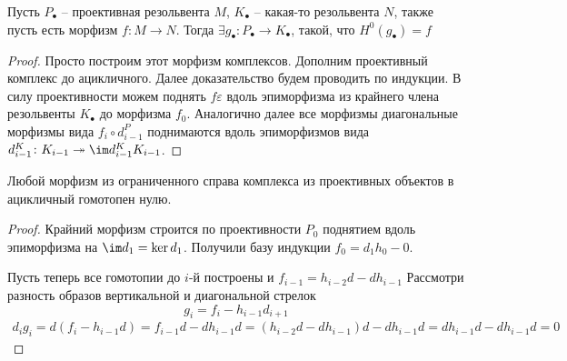 \documentclass[../main.tex]{subfiles}
\begin{document}
\begin{to_lem}
    Пусть $P_\bullet$ -- проективная резольвента $M$, $K_\bullet$ -- какая-то резольвента $N$, также пусть есть морфизм $f \colon M \to N$. Тогда $\exists g_\bullet\colon P_\bullet\to K_\bullet$, такой, что $H^0(g_\bullet) = f$
\end{to_lem}
\begin{proof}
    Просто построим этот морфизм комплексов. Дополним проективный комплекс до ацикличного. Далее доказательство будем проводить по индукции.  В силу проективности можем поднять $f\varepsilon$ вдоль эпиморфизма из крайнего члена резольвенты $K_\bullet$ до морфизма $f_0$. Аналогично далее все морфизмы диагональные морфизмы вида $f_i\circ d_{i-1}^P$ поднимаются вдоль эпиморфизмов вида $d_{i-1}^K\colon K_{i-1}\twoheadrightarrow \im d_{i-1}^K K_{i-1}$.
    \bee
    \eee
\end{proof} 
\begin{to_lem}\label{PtoAc}
    Любой морфизм из ограниченного справа комплекса из проективных объектов в ацикличный гомотопен нулю. 
\end{to_lem}
\begin{proof}
Крайний морфизм строится по проективности $P_0$ поднятием вдоль эпиморфизма на $\im d_1 = \ker d_{1}$. Получили базу индукции $f_0 = d_1 h_0 - 0 $.
        \bee
    \eee
Пусть теперь все гомотопии до $i$-й построены и $f_{i-1} = h_{i-2}d - dh_{i-1}$ Рассмотри разность образов вертикальной и диагональной стрелок 
\[g_i = f_i - h_{i-1} d_{i+1} \]
\begin{align*}
       d_i g_i = d(f_i - h_{i-1}d) = f_{i-1}d - d h_{i-1}d = (h_{i-2}d - d h_{i-1})d - d h_{i-1}d = d h_{i-1} d - d h_{i-1} d = 0
\end{align*}
\end{proof}
\end{document}
